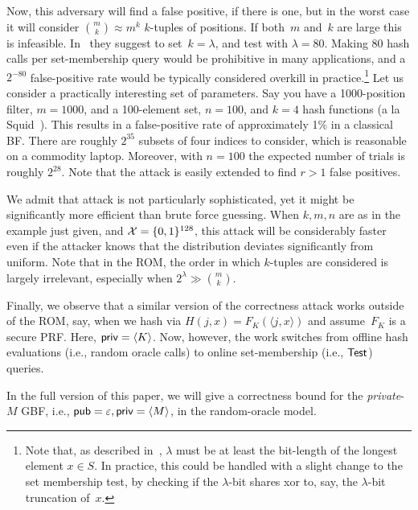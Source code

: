 Now, this adversary will find a false positive, if there is one, but in the worst case it will consider
$\binom{m}{k} \approx m^k$ $k$-tuples of positions.  If both~$m$
and~$k$ are large this is infeasible.  In~\cite{dong2013private} they suggest to
set~$k=\lambda$, and test with $\lambda=80$.  Making 80 hash calls per
set-membership query would be prohibitive in many applications, and a
$2^{-80}$ false-positive rate would be typically considered overkill in
practice.\footnote{Note
that, as described in~\cite{dong2013private}, $\lambda$ must be at least the
bit-length of the longest element $x \in S$. In practice, this could be
  handled with a slight change to the set membership test, by checking
if the $\lambda$-bit shares xor to, say, the $\lambda$-bit truncation
of~$x$.}
Let us consider a practically interesting set of parameters. Say you have a 1000-position
filter, $m=1000$, and a 100-element set, $n=100$,  and $k=4$ hash
functions (a la Squid~\cite{fan2000summary}).  This results in a false-positive rate of
approximately 1\% in a classical BF.  There are roughly $2^{35}$
subsets of four indices to consider, which is reasonable on a
commodity laptop.  Moreover, with $n=100$ the expected
number of trials is roughly $2^{28}$.
Note that the attack is easily extended to find $r>1$ false positives.

We admit that attack is not particularly sophisticated, yet it might
be significantly more efficient than brute force guessing.  When $k,m,n$ are as in the example just given, and ${\cal X}=\{0,1\}^{128}$,
this attack will be considerably faster even if the attacker knows that the distribution deviates significantly from uniform.   Note that in the ROM, the order in which $k$-tuples are considered is largely irrelevant, especially when $2^\lambda \gg \binom{m}{k}$.

Finally, we observe that a similar version of the correctness attack
works outside of the ROM, say, when we hash via $H(j,x)=F_K(\langle
j,x \rangle)$ and assume~$F_K$ is a secure PRF.  Here,
${\sf priv}=\langle K \rangle$.  Now,
however, the work switches from offline hash evaluations (i.e., random
oracle calls) to online set-membership (i.e., $\mathsf{Test}$) queries.

In the full version of this paper, we will give a correctness bound
for the \emph{private}-$M$ GBF, i.e., ${\sf pub}=\varepsilon,
{\sf priv}=\langle M \rangle$, in the random-oracle model.
%

